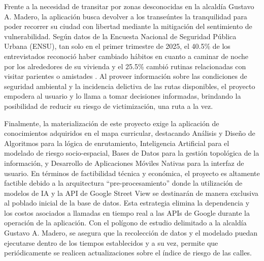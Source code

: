 Frente a la necesidad de transitar por zonas desconocidas en la alcaldía Gustavo A. Madero, la aplicación busca devolver a los transeúntes la tranquilidad para poder recorrer su ciudad con libertad mediante la mitigación del sentimiento de vulnerabilidad. Según datos de la Encuesta Nacional de Seguridad Pública Urbana (ENSU), tan solo en el primer trimestre de 2025, el 40.5\% de los entrevistados reconoció haber cambiado hábitos en cuanto a caminar de noche por los alrededores de su vivienda y el 25.5\% cambió rutinas relacionadas con visitar parientes o amistades \cite{inegi2025ensu}. Al proveer información sobre las condiciones de seguridad ambiental y la incidencia delictiva de las rutas disponibles, el proyecto empodera al usuario y lo llama a tomar decisiones informadas, brindando la posibilidad de reducir su riesgo de victimización, una ruta a la vez.

Finalmente, la materialización de este proyecto exige la aplicación de conocimientos adquiridos en el mapa curricular, destacando Análisis y Diseño de Algoritmos para la lógica de enrutamiento, Inteligencia Artificial para el modelado de riesgo socio-espacial, Bases de Datos para la gestión topológica de la información, y Desarrollo de Aplicaciones Móviles Nativas para la interfaz de usuario. En términos de factibilidad técnica y económica, el proyecto es altamente factible debido a la arquitectura “pre-procesamiento” donde la utilización de modelos de IA y la API de Google Street View se destinarán de manera exclusiva al poblado inicial de la base de datos. Esta estrategia elimina la dependencia y los costos asociados a llamadas en tiempo real a las APIs de Google durante la operación de la aplicación. Con el polígono de estudio delimitado a la alcaldía Gustavo A. Madero, se asegura que la recolección de datos y el modelado puedan ejecutarse dentro de los tiempos establecidos y a su vez, permite que periódicamente se realicen actualizaciones sobre el índice de riesgo de las calles.
